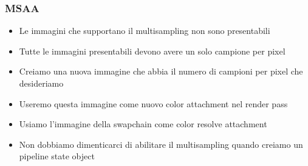 \begin{frame}
\frametitle{MSAA}
\begin{itemize}
\item Le immagini che supportano il multisampling non sono presentabili
\item Tutte le immagini presentabili devono avere un solo campione per pixel
\item Creiamo una nuova immagine che abbia il numero di campioni per pixel che desideriamo
\item Useremo questa immagine come nuovo color attachment nel render pass
\item Usiamo l'immagine della swapchain come color resolve attachment
\item Non dobbiamo dimenticarci di abilitare il multisampling quando creiamo un pipeline state object
\end{itemize}
\end{frame}
